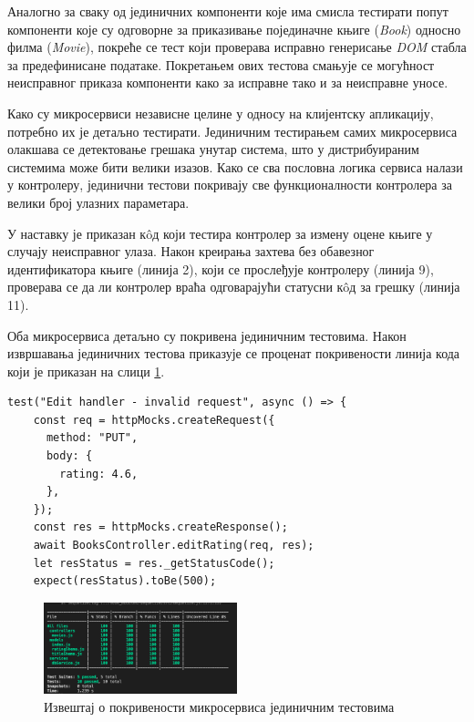 \documentclass[12pt,oneside]{memoir}
\begin{document}
Аналогно за сваку од јединичних компоненти које има смисла тестирати попут компоненти које су одговорне за приказивање појединачне књиге (\textit{Book}) односно филма (\textit{Movie}), покреће се тест који проверава исправно генерисање \textit{DOM} стабла за предефинисане податаке. Покретањем ових тестова смањује се могућност неисправног приказа компоненти како за исправне тако и за неисправне уносе.

Како су микросервиси независне целине у односу на клијентску апликацију, потребно их је детаљно тестирати. Јединичним тестирањем самих микросервиса олакшава се детектовање грешака унутар система, што у дистрибуираним системима може бити велики изазов. Како се сва пословна логика сервиса налази у контролеру, јединични тестови покривају све функционалности контролера за велики број улазних параметара. 

У наставку је приказан к\^{o}д који тестира контролер за измену оцене књиге у случају неисправног улаза. Након креирања захтева без обавезног идентификатора књиге (линија 2), који се прослеђује контролеру (линија 9), проверава се да ли контролер враћа одговарајући статусни к\^{o}д за грешку (линија 11). 

Оба микросервиса детаљно су покривена јединичним тестовима. Након извршавања јединичних тестова приказује се проценат покривености линија кода који је приказан на слици \ref{fig:pokrivenost}.

\begin{lstlisting}[caption=Јединично тестирање контролера за измену оцене књиге --- неисправан улаз,
label={lst:testController},
frame=single]
test("Edit handler - invalid request", async () => {
    const req = httpMocks.createRequest({
      method: "PUT",
      body: {
        rating: 4.6,
      },
    });
    const res = httpMocks.createResponse();
    await BooksController.editRating(req, res);
    let resStatus = res._getStatusCode();
    expect(resStatus).toBe(500);
\end{lstlisting}



\begin{figure}[!ht]
  \centering
  \includegraphics[width=0.5\textwidth]{matfmaster/img/coverage.png}
  \caption{Извештај о покривености микросервиса јединичним тестовима}
  \label{fig:pokrivenost}
\end{figure}
\end{document}

